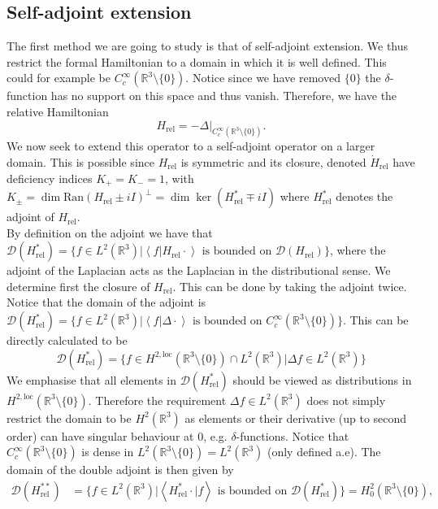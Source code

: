 \documentclass[a4paper,11pt]{article}
\newcommand{\dom}[1]{\mathscr D\left(#1\right)}
\renewcommand{\braket}[1]{\left\langle#1\right\rangle}
\newcommand{\R}{\mathbb{R}}
\numberwithin{equation}{section}
\begin{document}
\subsection{Self-adjoint extension}
The first method we are going to study is that of self-adjoint extension. We thus restrict the formal Hamiltonian to a domain in which it is well defined. This could for example be $ C_c^\infty(\mathbb{R}^3\setminus\{0\}) $. Notice since we have removed $ \{0\} $ the $ \delta $-function has no support on this space and thus vanish. Therefore, we have the relative Hamiltonian \begin{equation}
H_{\text{rel}}=-\Delta\rvert_{C_c^\infty(\mathbb{R}^3\setminus\{0\})}.
\end{equation}
We now seek to extend this operator to a self-adjoint operator on a larger domain. This is possible since $ H_{\text{rel}} $ is symmetric and its closure, denoted $ \dot{H}_{\text{rel}} $ have deficiency indices $ K_+=K_-=1 $, with $ K_\pm=\dim\text{Ran}(H_{\text{rel}}\pm iI)^\perp=\dim\ker(H_{\text{rel}}^*\mp iI) $ where $ H_{\text{rel}}^* $ denotes the adjoint of $ H_{\text{rel}} $. \\
By definition on the adjoint we have that $ \dom{H_{\text{rel}}^*}=\{f\in L^2(\R^3)\rvert \braket{f|H_{\text{rel}}\cdot} \text{ is bounded on }\dom{H_{\text{rel}}}\} $, where the adjoint of the Laplacian acts as the Laplacian in the distributional sense. We determine first the closure of $ H_{\text{rel}} $. This can be done by taking the adjoint twice. Notice that the domain of the adjoint is $ \dom{H_{\text{rel}}^*}=\{f\in L^2(\R^3)\rvert \braket{f|\Delta\cdot} \text{ is bounded on }C_c^\infty(\R^3\setminus\{0\})\} $. This can be directly calculated to be \begin{equation}
\dom{H_{\text{rel}}^*}=\{f\in H^{2,\text{loc}}(\R^3\setminus\{0\})\cap L^2(\R^3)\rvert \Delta f \in L^2(\R^3)\}
\end{equation}
We emphasise that all elements in $ \dom{H_{\text{rel}}^*} $ should be viewed as distributions in $ H^{2,\text{loc}}(\R^3\setminus\{0\}) $. Therefore the requirement $ \Delta f\in L^2(\R^3) $ does not simply restrict the domain to be $ H^2(\R^3) $ as elements or their derivative (up to second order) can have singular behaviour at $ 0 $, e.g. $ \delta $-functions.
 Notice that $ C_c^\infty(\mathbb{R}^3\setminus\{0\}) $ is dense in $ L^2(\mathbb{R}^3\setminus\{0\})=L^2(\R^3) $ (only defined a.e).  The domain of the double adjoint is then given by \begin{equation}\begin{aligned}
\dom{H_{\text{rel}}^{**}}&=\{f\in L^2(\R^3)\rvert \braket{H_{\text{rel}}^*\cdot|f} \text{ is bounded on }\dom{H_{\text{rel}}^*}\}=H^2_0(\R^3\setminus\{0\}),
\end{aligned}
\end{equation} 
\end{document}
